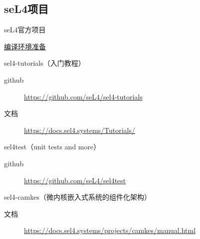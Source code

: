 \documentclass[presentation,dvipdfmx,CJKbookmarks]{beamer}
\begin{document}
\begin{CJK*}{UTF8}{simsun}
\section{seL4\thinspace 项目}
\label{sec:org1f9d8e9}
\begin{frame}[label={sec:org4b80ab6}]{seL4\thinspace 官方项目}
\begin{block}{\href{https://docs.sel4.systems/projects/buildsystem/host-dependencies.html}{编译环境准备}}
\end{block}
\begin{block}{sel4-tutorials（入门教程）}
\begin{description}
\item[{github}] \url{https://github.com/seL4/sel4-tutorials}
\item[{文档}] \url{https://docs.sel4.systems/Tutorials/}
\end{description}
\end{block}
\begin{block}{sel4test（unit tests and more）}
\begin{description}
\item[{github}] \url{https://github.com/seL4/sel4test}
\end{description}
\end{block}

\begin{block}{sel4-camkes（微内核嵌入式系统的组件化架构）}
\begin{description}
\item[{文档}] \url{https://docs.sel4.systems/projects/camkes/manual.html}
\end{description}
\end{block}
\end{frame}


\end{CJK*}
\end{document}
